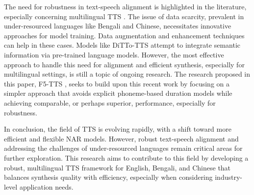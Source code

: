 The need for robustness in text-speech alignment is highlighted in the literature, especially concerning multilingual TTS \cite{saeki2024extendingmultilingualspeechsynthesis}. The issue of data scarcity, prevalent in under-resourced languages like Bengali and Chinese, necessitates innovative approaches for model training. Data augmentation and enhancement techniques can help in these cases. Models like DiTTo-TTS \cite{lee2024dittottsefficientscalablezeroshot} attempt to integrate semantic information via pre-trained language models. However, the most effective approach to handle this need for alignment and efficient synthesis, especially for multilingual settings, is still a topic of ongoing research. The research proposed in this paper, F5-TTS \cite{chen2024f5ttsfairytalerfakesfluent}, seeks to build upon this recent work by focusing on a simpler approach that avoids explicit phoneme-based duration models while achieving comparable, or perhaps superior, performance, especially for robustness. \newline

In conclusion, the field of TTS is evolving rapidly, with a shift toward more efficient and flexible NAR models. However, robust text-speech alignment and addressing the challenges of under-resourced languages remain critical areas for further exploration. This research aims to contribute to this field by developing a robust, multilingual TTS framework for English, Bengali, and Chinese that balances synthesis quality with efficiency, especially when considering industry-level application needs.
